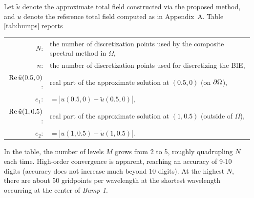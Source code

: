 \documentclass[11pt,final]{amsart}
\theoremstyle{definition}
\numberwithin{remark}{section}
\numberwithin{definition}{section}
\numberwithin{pro}{section}
\begin{document}
Let $\tilde{u}$ denote the approximate total field constructed via the proposed method,
and $u$ denote the reference total field computed as in Appendix~A.
Table \ref{tab:bumps} reports

\vspace{.5ex}
\begin{tabular}{rl}
 $N$: & the number of discretization points used by the composite spectral method in $\Omega$, \\
$n$:& the number of discretization points used for discretizing the BIE,  \\
$\operatorname{Re} \tilde{u}(0.5,0)$:& real part of the approximate solution at $(0.5,0)$ (on ${\partial\Omega}$),\\
 $e_1$:& $=|u(0.5,0)-\tilde{u}(0.5,0)|$,\\
$\operatorname{Re} \tilde{u}(1,0.5)$:& real part of the approximate solution at $(1,0.5)$ (outside of $\Omega$),\\
$e_2$:&   $=|u(1,0.5)-\tilde{u}(1,0.5)|$.
\end{tabular}
\vspace{.5ex}

In the table, the number of levels $M$ grows from 2 to 5, roughly quadrupling $N$ each time.
High-order convergence is apparent, reaching an accuracy of 9-10 digits
(accuracy does not increase much beyond 10 digits).
At the highest $N$, there are about 50 gridpoints per wavelength at the shortest
wavelength occurring at the center of {\em Bump 1}.
\end{document}
